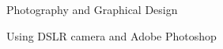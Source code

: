 \begin{cvprojects}

  \cvproject
    {Photography and Graphical Design} %
    {} %
    {} %
    {} %
    {\begin{cvitems}\item{Using DSLR camera and Adobe Photoshop}\end{cvitems}}

\end{cvprojects}


